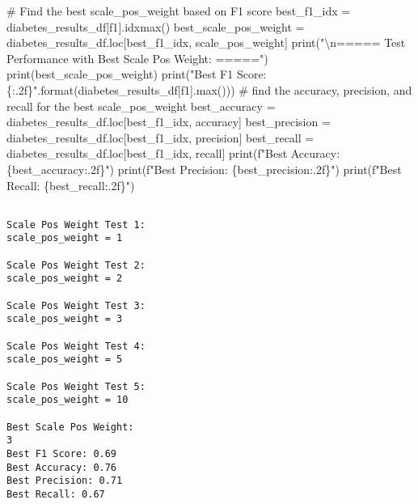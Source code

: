 \documentclass[
  letterpaper,
  DIV=11,
  numbers=noendperiod]{scrreprt}
\newenvironment{Shaded}{\begin{snugshade}}{\end{snugshade}}
\newcommand{\BuiltInTok}[1]{\textcolor[rgb]{0.00,0.23,0.31}{#1}}
\newcommand{\CharTok}[1]{\textcolor[rgb]{0.13,0.47,0.30}{#1}}
\newcommand{\CommentTok}[1]{\textcolor[rgb]{0.37,0.37,0.37}{#1}}
\newcommand{\NormalTok}[1]{\textcolor[rgb]{0.00,0.23,0.31}{#1}}
\newcommand{\OperatorTok}[1]{\textcolor[rgb]{0.37,0.37,0.37}{#1}}
\newcommand{\SpecialCharTok}[1]{\textcolor[rgb]{0.37,0.37,0.37}{#1}}
\newcommand{\SpecialStringTok}[1]{\textcolor[rgb]{0.13,0.47,0.30}{#1}}
\newcommand{\StringTok}[1]{\textcolor[rgb]{0.13,0.47,0.30}{#1}}
\begin{document}
\begin{Shaded}
\begin{Highlighting}[]
\CommentTok{\# Find the best scale\_pos\_weight based on F1 score}
\NormalTok{best\_f1\_idx }\OperatorTok{=}\NormalTok{ diabetes\_results\_df[}\StringTok{\textquotesingle{}f1\textquotesingle{}}\NormalTok{].idxmax()}
\NormalTok{best\_scale\_pos\_weight }\OperatorTok{=}\NormalTok{ diabetes\_results\_df.loc[best\_f1\_idx, }\StringTok{\textquotesingle{}scale\_pos\_weight\textquotesingle{}}\NormalTok{]}
\BuiltInTok{print}\NormalTok{(}\StringTok{"}\CharTok{\textbackslash{}n}\StringTok{===== Test Performance with Best Scale Pos Weight: ====="}\NormalTok{)}
\BuiltInTok{print}\NormalTok{(best\_scale\_pos\_weight)}
\BuiltInTok{print}\NormalTok{(}\StringTok{"Best F1 Score: }\SpecialCharTok{\{:.2f\}}\StringTok{"}\NormalTok{.}\BuiltInTok{format}\NormalTok{(diabetes\_results\_df[}\StringTok{\textquotesingle{}f1\textquotesingle{}}\NormalTok{].}\BuiltInTok{max}\NormalTok{()))}
\CommentTok{\# find the accuracy, precision, and recall for the best scale\_pos\_weight}
\NormalTok{best\_accuracy }\OperatorTok{=}\NormalTok{ diabetes\_results\_df.loc[best\_f1\_idx, }\StringTok{\textquotesingle{}accuracy\textquotesingle{}}\NormalTok{]}
\NormalTok{best\_precision }\OperatorTok{=}\NormalTok{ diabetes\_results\_df.loc[best\_f1\_idx, }\StringTok{\textquotesingle{}precision\textquotesingle{}}\NormalTok{]}
\NormalTok{best\_recall }\OperatorTok{=}\NormalTok{ diabetes\_results\_df.loc[best\_f1\_idx, }\StringTok{\textquotesingle{}recall\textquotesingle{}}\NormalTok{]}
\BuiltInTok{print}\NormalTok{(}\SpecialStringTok{f"Best Accuracy: }\SpecialCharTok{\{}\NormalTok{best\_accuracy}\SpecialCharTok{:.2f\}}\SpecialStringTok{"}\NormalTok{)}
\BuiltInTok{print}\NormalTok{(}\SpecialStringTok{f"Best Precision: }\SpecialCharTok{\{}\NormalTok{best\_precision}\SpecialCharTok{:.2f\}}\SpecialStringTok{"}\NormalTok{)}
\BuiltInTok{print}\NormalTok{(}\SpecialStringTok{f"Best Recall: }\SpecialCharTok{\{}\NormalTok{best\_recall}\SpecialCharTok{:.2f\}}\SpecialStringTok{"}\NormalTok{)}
\end{Highlighting}
\end{Shaded}

\begin{verbatim}

Scale Pos Weight Test 1:
scale_pos_weight = 1

Scale Pos Weight Test 2:
scale_pos_weight = 2

Scale Pos Weight Test 3:
scale_pos_weight = 3

Scale Pos Weight Test 4:
scale_pos_weight = 5

Scale Pos Weight Test 5:
scale_pos_weight = 10

Best Scale Pos Weight:
3
Best F1 Score: 0.69
Best Accuracy: 0.76
Best Precision: 0.71
Best Recall: 0.67
\end{verbatim}
\end{document}
